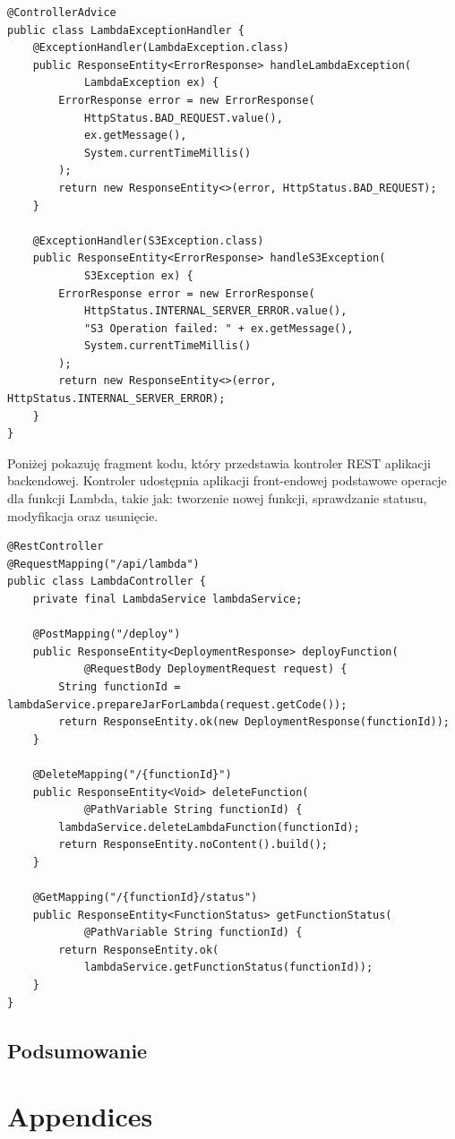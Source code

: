 \documentclass[runningheads,12pt]{llncs}
\begin{document}
\begin{verbatim}
@ControllerAdvice
public class LambdaExceptionHandler {
    @ExceptionHandler(LambdaException.class)
    public ResponseEntity<ErrorResponse> handleLambdaException(
            LambdaException ex) {
        ErrorResponse error = new ErrorResponse(
            HttpStatus.BAD_REQUEST.value(),
            ex.getMessage(),
            System.currentTimeMillis()
        );
        return new ResponseEntity<>(error, HttpStatus.BAD_REQUEST);
    }
    
    @ExceptionHandler(S3Exception.class)
    public ResponseEntity<ErrorResponse> handleS3Exception(
            S3Exception ex) {
        ErrorResponse error = new ErrorResponse(
            HttpStatus.INTERNAL_SERVER_ERROR.value(),
            "S3 Operation failed: " + ex.getMessage(),
            System.currentTimeMillis()
        );
        return new ResponseEntity<>(error, HttpStatus.INTERNAL_SERVER_ERROR);
    }
}
\end{verbatim}

Poniżej pokazuję fragment kodu, który przedstawia kontroler REST aplikacji backendowej. Kontroler udostępnia aplikacji front-endowej podstawowe operacje dla funkcji Lambda, takie jak: tworzenie nowej funkcji, sprawdzanie statusu, modyfikacja oraz usunięcie.

\begin{verbatim}
@RestController
@RequestMapping("/api/lambda")
public class LambdaController {
    private final LambdaService lambdaService;

    @PostMapping("/deploy")
    public ResponseEntity<DeploymentResponse> deployFunction(
            @RequestBody DeploymentRequest request) {
        String functionId = lambdaService.prepareJarForLambda(request.getCode());
        return ResponseEntity.ok(new DeploymentResponse(functionId));
    }

    @DeleteMapping("/{functionId}")
    public ResponseEntity<Void> deleteFunction(
            @PathVariable String functionId) {
        lambdaService.deleteLambdaFunction(functionId);
        return ResponseEntity.noContent().build();
    }
    
    @GetMapping("/{functionId}/status")
    public ResponseEntity<FunctionStatus> getFunctionStatus(
            @PathVariable String functionId) {
        return ResponseEntity.ok(
            lambdaService.getFunctionStatus(functionId));
    }
}
\end{verbatim}



\subsection{Podsumowanie}

\nocite{*}

\listoftables

\listoffigures




\section{Appendices}
\end{document}
